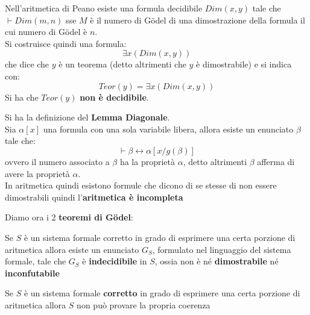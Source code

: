 \documentclass[a4paper,12pt, oneside]{book}
\begin{document}
Nell'aritmetica di Peano esiste una formula decidibile $Dim(x,y)$ tale che
$\vdash Dim(m,n)$ sse $M$ è il numero di G\"{o}del di una dimostrazione della
formula il cui numero di G\"{o}del è $n$.\\
Si costruisce quindi una formula:
\[\exists x(Dim(x,y))\]
che dice che $y$ è un teorema (detto altrimenti che $y$ è dimostrabile) e si
indica con:
\[Teor(y)=\exists x(Dim(x,y))\]
Si ha che $Teor(y)$ \textbf{non è decidibile}.
\begin{definizione}
  Si ha la definizione del \textbf{Lemma Diagonale}.\\
  Sia $\alpha[x]$ una formula con una sola variabile libera, allora esiste un
  enunciato $\beta$ tale che:
  \[\vdash\beta\leftrightarrow\alpha[x/g(\beta)]\]
  ovvero il numero associato a $\beta$ ha la proprietà $\alpha$, detto
  altrimenti $\beta$ afferma di avere la proprietà $\alpha$.\\
  
  In aritmetica quindi esistono formule che dicono di se stesse di non essere
  dimostrabili quindi l'\textbf{aritmetica è incompleta}
\end{definizione}
Diamo ora i 2 \textbf{teoremi di G\"{o}del}:
\begin{teorema}
  Se $S$ è un sistema formale corretto in grado di esprimere una certa porzione
  di aritmetica allora esiste un enunciato $G_S$, formulato nel linguaggio del
  sistema formale, tale che $G_S$ è \textbf{indecidibile} in $S$, ossia non è né
  \textbf{dimostrabile} né \textbf{inconfutabile} 
\end{teorema}
\begin{teorema}
  Se $S$ è un sistema formale \textbf{corretto} in grado di esprimere una certa
  porzione di aritmetica allora $S$ non può provare la propria coerenza  
\end{teorema}
\end{document}
